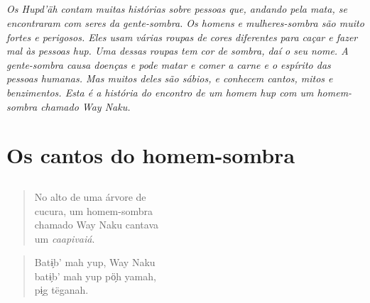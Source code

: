 \chapter*{}
\thispagestyle{empty}

\vspace*{\fill}
\textit{Os Hupd'äh contam muitas histórias sobre pessoas que, andando pela mata, se
encontraram com seres da gente-sombra. Os homens e mulheres-sombra são muito fortes e perigosos. Eles usam várias roupas de cores diferentes para caçar e fazer mal às pessoas hup. Uma dessas roupas tem cor de sombra, daí o seu nome. A gente-sombra causa doenças e pode matar e comer a carne e o espírito das pessoas humanas. Mas muitos deles são sábios, e conhecem cantos, mitos e benzimentos. Esta é a história do encontro de um homem hup com um homem-sombra chamado Way Naku.}
\vspace*{\fill}

\openany

\blankpage
\part{Os cantos do homem-sombra}


\chapter*{}

\mbox{}\vspace*{\fill}

\begin{verse}
No alto de uma árvore de\\
cucura, um homem-sombra\\
chamado Way Naku cantava\\
um \textit{caapivaiá}.
\end{verse}

\begin{verse}
Batɨ̗b’ mah yup, Way Naku\\
batɨ̗b’ mah yup pö̗h yamah,\\
pɨ̗g tëganah.
\end{verse}

\vspace*{\fill}

